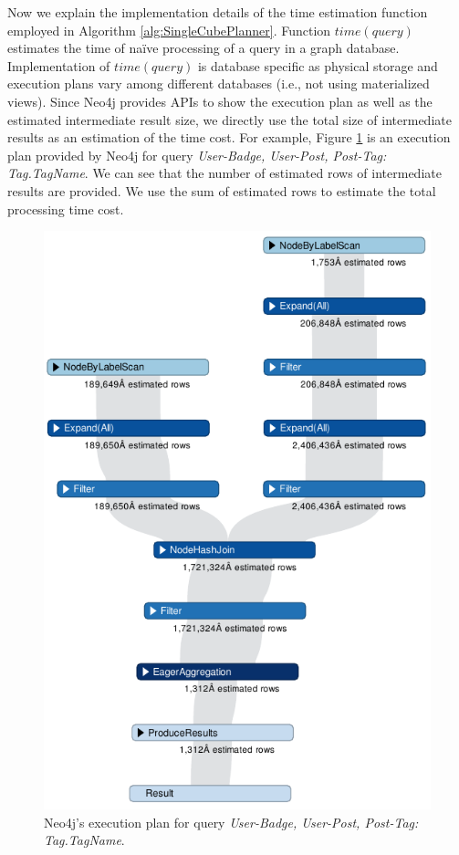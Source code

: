 	Now we explain the implementation details of the time estimation function employed in Algorithm \ref{alg:SingleCubePlanner}.
	Function \textbf{$time(query)$} estimates the time of na\"ive  processing of a query in a graph database. Implementation of $time(query)$ is database specific as physical storage and execution plans vary among different databases (i.e., not using materialized views). Since Neo4j provides APIs to show the execution plan as well as the estimated intermediate result size, we directly use the total size of intermediate results as an estimation of the time cost. For example, Figure \ref{fig:4:2} is an execution plan provided by Neo4j for query \textit{User-Badge, User-Post, Post-Tag: Tag.TagName}. We can see that the number of estimated rows of intermediate results are provided. We use the sum of estimated rows to estimate the total processing time cost.
	
	
	\begin {figure}[H]
	\centering
	\includegraphics[scale=1.3]{pic/eplan.pdf}
	\caption{Neo4j's execution plan for query \textit{User-Badge, User-Post, Post-Tag: Tag.TagName}.}
	\label{fig:4:2}
\end{figure}

